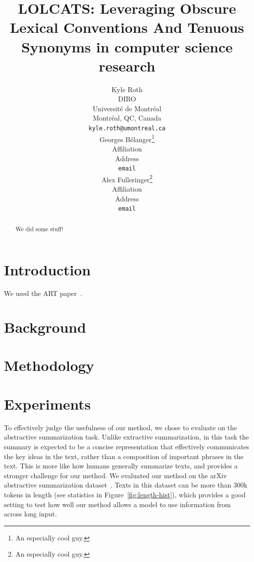 \documentclass{article}
\title{LOLCATS: Leveraging Obscure Lexical Conventions And Tenuous Synonyms in computer science research}
\author{%
  Kyle Roth \\
  DIRO \\
  Université de Montréal \\
  Montréal, QC, Canada \\
  \texttt{kyle.roth@umontreal.ca} \\
  \And
  Georges Bélanger\thanks{An especially cool guy.} \\
  Affiliation \\
  Address \\
  \texttt{email} \\
  \And
  Alex Fulleringer\thanks{An especially cool guy.} \\
  Affiliation \\
  Address \\
  \texttt{email} \\
}
\begin{document}
\maketitle


\begin{abstract}
  We did some stuff!
\end{abstract}


\section{Introduction}


We used the ART paper~\cite{paranjape2023art}.


\section{Background}


\section{Methodology}


\section{Experiments}\label{section:experiments}

To effectively judge the usefulness of our method, we chose to evaluate on the abstractive summarization task. Unlike extractive summarization, in this task the summary is expected to be a concise representation that effectively communicates the key ideas in the text, rather than a composition of important phrases in the text. This is more like how humans generally summarize texts, and provides a stronger challenge for our method. We evaluated our method on the arXiv abstractive summarization dataset~\cite{cohan-etal-2018-discourse}. Texts in this dataset can be more than 300k tokens in length (see statistics in Figure~\ref{fig:length-hist}), which provides a good setting to test how well our method allows a model to use information from across long input.
\end{document}
